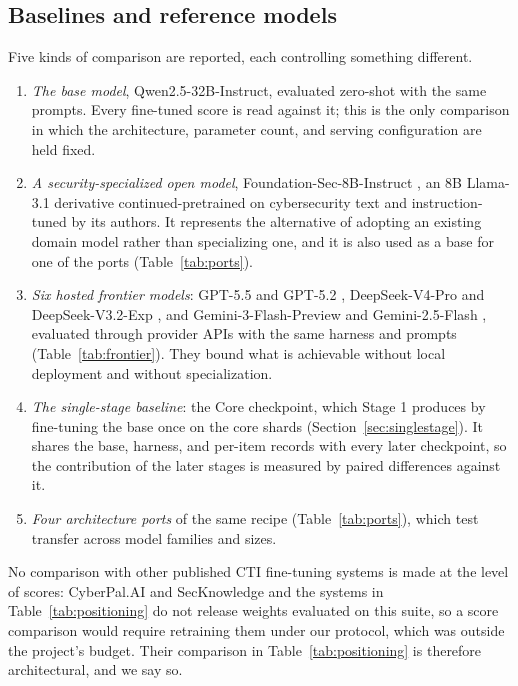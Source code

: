 \documentclass[twocolumn]{svjour3}
\begin{document}
\subsection{Baselines and reference models}\label{sec:baselines}
Five kinds of comparison are reported, each controlling something different.
\begin{enumerate}
\item \emph{The base model}, Qwen2.5-32B-Instruct, evaluated zero-shot with the same prompts. Every fine-tuned score is read against it; this is the only comparison in which the architecture, parameter count, and serving configuration are held fixed.
\item \emph{A security-specialized open model}, Foundation-Sec-8B-Instruct \cite{kassianik2025foundationsec}, an 8B Llama-3.1 derivative continued-pretrained on cybersecurity text and instruction-tuned by its authors. It represents the alternative of adopting an existing domain model rather than specializing one, and it is also used as a base for one of the ports (Table~\ref{tab:ports}).
\item \emph{Six hosted frontier models}: GPT-5.5 and GPT-5.2 \cite{openai2026gpt55,openai2025gpt52}, DeepSeek-V4-Pro and DeepSeek-V3.2-Exp \cite{deepseek2026v4,deepseek2025v32exp}, and Gemini-3-Flash-Preview and Gemini-2.5-Flash \cite{google2025gemini3flash,comanici2025gemini25}, evaluated through provider APIs with the same harness and prompts (Table~\ref{tab:frontier}). They bound what is achievable without local deployment and without specialization.
\item \emph{The single-stage baseline}: the Core checkpoint, which Stage 1 produces by fine-tuning the base once on the core shards (Section~\ref{sec:singlestage}). It shares the base, harness, and per-item records with every later checkpoint, so the contribution of the later stages is measured by paired differences against it.
\item \emph{Four architecture ports} of the same recipe (Table~\ref{tab:ports}), which test transfer across model families and sizes.
\end{enumerate}
No comparison with other published CTI fine-tuning systems is made at the level of scores: CyberPal.AI and SecKnowledge \cite{levi2025cyberpal} and the systems in Table~\ref{tab:positioning} do not release weights evaluated on this suite, so a score comparison would require retraining them under our protocol, which was outside the project's budget. Their comparison in Table~\ref{tab:positioning} is therefore architectural, and we say so.
\end{document}
